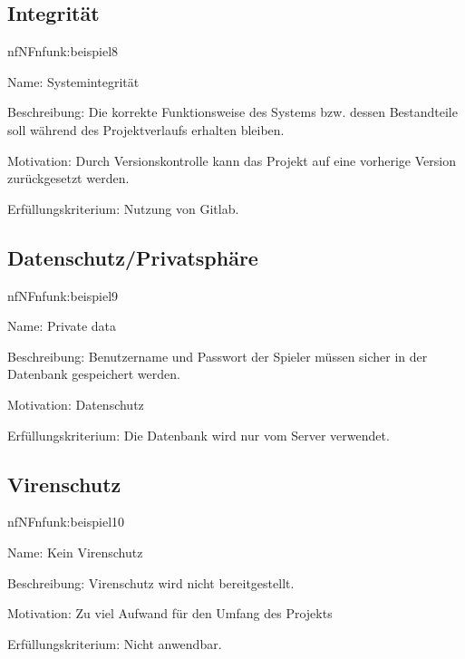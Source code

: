 \subsection{Integrität}

\begin{description}[leftmargin=5em, style=sameline]	
	\begin{lhp}{nf}{NF}{nfunk:beispiel8}
		\item [Name:] {Systemintegrität}
		\item [Beschreibung:] {Die korrekte Funktionsweise des Systems bzw. dessen Bestandteile soll während des Projektverlaufs erhalten bleiben.}
		\item [Motivation:] {Durch Versionskontrolle kann das Projekt auf eine vorherige Version zurückgesetzt werden.}
		\item [Erfüllungskriterium:] {Nutzung von Gitlab.}
	\end{lhp}
\end{description}

\subsection{Datenschutz/Privatsphäre}

\begin{description}[leftmargin=5em, style=sameline]	
	\begin{lhp}{nf}{NF}{nfunk:beispiel9}
		\item [Name:] {Private data}
		\item [Beschreibung:] {Benutzername und Passwort der Spieler müssen sicher in der Datenbank gespeichert werden.}
		\item [Motivation:] {Datenschutz}
		\item [Erfüllungskriterium:] {Die Datenbank wird nur vom Server verwendet.}
	\end{lhp}
\end{description}


\subsection{Virenschutz}

\begin{description}[leftmargin=5em, style=sameline]	
	\begin{lhp}{nf}{NF}{nfunk:beispiel10}
		\item [Name:] {Kein Virenschutz}
		\item [Beschreibung:] {Virenschutz wird nicht bereitgestellt.}
		\item [Motivation:] {Zu viel Aufwand für den Umfang des Projekts}
		\item [Erfüllungskriterium:] {Nicht anwendbar.}
	\end{lhp}
\end{description}

